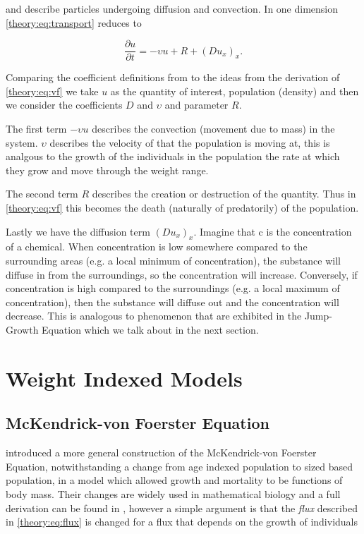\documentclass[../main]{subfiles}
\begin{document}
  and describe particles undergoing diffusion and convection. In one dimension \autoref{theory:eq:transport} reduces to

  \begin{equation}\label{theory:eq:transport1d}
    \frac{\partial u}{\partial t} = - \upsilon u + R + (D u_x)_x.
  \end{equation}

  Comparing the coefficient definitions from \cite{stocker2011} to the ideas from the derivation of \autoref{theory:eq:vf} we take $u$ as the quantity of interest, population (density) and then we consider the coefficients $D$ and $\upsilon$ and parameter $R$.

  The first term $-\upsilon u$ describes the convection (movement due to mass) in the system. $\upsilon$ describes the velocity of that the population is moving at, this is analgous to the growth of the individuals in the population the rate at which they grow and move through the weight range.

  The second term $R$ describes the creation or destruction of the quantity. Thus in \autoref{theory:eq:vf} this becomes the death (naturally of predatorily) of the population.

  Lastly we have the diffusion term $(D u_x)_x$. Imagine that c is the concentration of a chemical. When concentration is low somewhere compared to the surrounding areas (e.g. a local minimum of concentration), the substance will diffuse in from the surroundings, so the concentration will increase. Conversely, if concentration is high compared to the surroundings (e.g. a local maximum of concentration), then the substance will diffuse out and the concentration will decrease. This is analogous to phenomenon that are exhibited in the Jump-Growth Equation which we talk about in the next section.

  \section{Weight Indexed Models}
  \subsection{McKendrick-von Foerster Equation}\label{theory:sec:mvf}
  \cite{silvert1978} introduced a more general construction of the McKendrick-von Foerster Equation, notwithstanding a change from age indexed population to sized based population, in a model which allowed growth and mortality to be functions of body mass. Their changes are widely used in mathematical biology and a full derivation can be found in \cite{silvert1978}, however a simple argument is that the \emph{flux} described in \autoref{theory:eq:flux} is changed for a flux that depends on the growth of individuals
\end{document}
